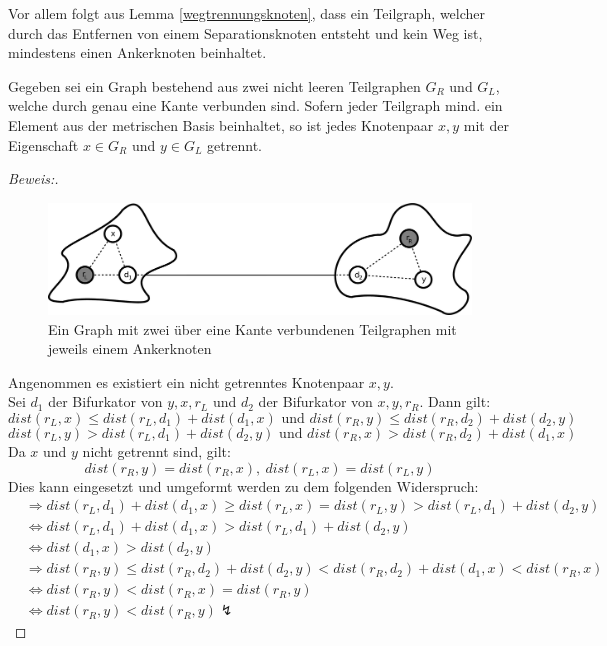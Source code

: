 \begin{bem}
Vor allem folgt aus Lemma \ref{wegtrennungsknoten}, dass ein Teilgraph, welcher durch das Entfernen von einem Separationsknoten entsteht und kein Weg ist, mindestens einen Ankerknoten beinhaltet.
\end{bem}
\begin{lem}
\label{second_theorem}
Gegeben sei ein Graph bestehend aus zwei nicht leeren Teilgraphen $G_R$ und $G_L$, welche durch genau eine Kante verbunden sind. Sofern jeder Teilgraph mind. ein Element aus der metrischen Basis beinhaltet, so ist jedes Knotenpaar $x,y$ mit der Eigenschaft $x \in G_R$ und $y \in G_L$ getrennt.
\end{lem}
\vspace{-4mm}
\begin{proof}[Beweis:] ~
\vspace{-2mm}
\begin{figure}[h!]
		\centering 		 
  \includegraphics[width=340pt]{bilder/bew5.pdf}
	\caption{Ein Graph mit zwei über eine Kante verbundenen Teilgraphen mit jeweils einem Ankerknoten}
\vspace{-2mm}
  	 \end{figure}
  Angenommen es existiert ein nicht getrenntes Knotenpaar $x,y$.\\Sei $d_1$ der Bifurkator von $y,x,r_L$ und $d_2$ der Bifurkator von $x,y,r_R$. Dann gilt: $$dist(r_L,x) \leq dist(r_L,d_1)+ dist(d_1,x)\text{ und }dist(r_R,y) \leq dist(r_R,d_2)+ dist(d_2,y)$$ $$dist(r_L,y) > dist(r_L,d_1)+ dist(d_2,y)\text{ und }dist(r_R,x) > dist(r_R,d_2)+ dist(d_1,x)$$
  Da $x$ und $y$ nicht getrennt sind, gilt:
   $$dist(r_R,y) =dist(r_R,x),\: dist(r_L,x) = dist(r_L,y)$$ Dies kann eingesetzt und umgeformt werden zu dem folgenden Widerspruch:\begin{align*}
&\Rightarrow dist(r_L,d_1)+ dist(d_1,x) \geq dist(r_L,x) = dist(r_L,y)> dist(r_L,d_1)+ dist(d_2,y)\\
&\Leftrightarrow dist(r_L,d_1)+ dist(d_1,x) > dist(r_L,d_1)+ dist(d_2,y)\\
&\Leftrightarrow dist(d_1,x) >  dist(d_2,y)\\
&\Rightarrow dist(r_R,y) \leq dist(r_R,d_2)+ dist(d_2,y) < dist(r_R,d_2) + dist(d_1,x) < dist(r_R,x)\\
&\Leftrightarrow dist(r_R,y) < dist(r_R,x) = dist(r_R,y)\\&\Leftrightarrow dist(r_R,y) < dist(r_R,y) \lightning
\end{align*}  
   \vspace{-4mm}
  \end{proof}
